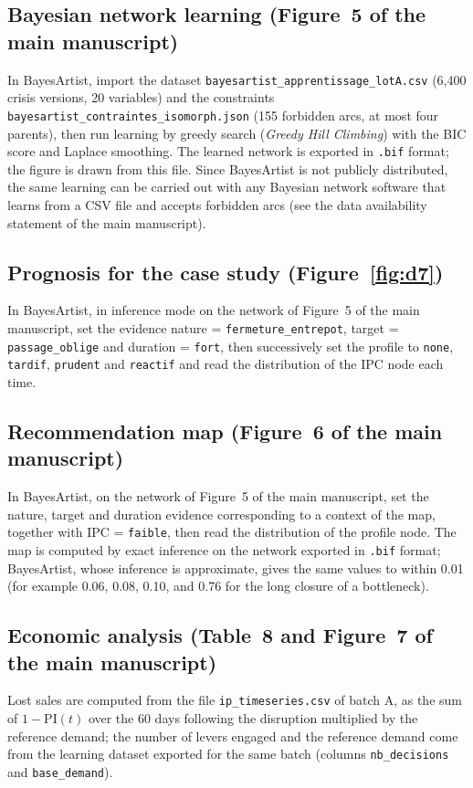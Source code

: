 \subsection*{Bayesian network learning (Figure~5 of the main manuscript)}

In BayesArtist, import the dataset \texttt{bayesartist\_apprentissage\_lotA.csv} (6,400 crisis versions, 20 variables) and the constraints \texttt{bayesartist\_contraintes\_isomorph.json} (155 forbidden arcs, at most four parents), then run learning by greedy search (\textit{Greedy Hill Climbing}) with the BIC score and Laplace smoothing. The learned network is exported in \texttt{.bif} format; the figure is drawn from this file. Since BayesArtist is not publicly distributed, the same learning can be carried out with any Bayesian network software that learns from a CSV file and accepts forbidden arcs (see the data availability statement of the main manuscript).

\subsection*{Prognosis for the case study (Figure~\ref{fig:d7})}

In BayesArtist, in inference mode on the network of Figure~5 of the main manuscript, set the evidence nature = \texttt{fermeture\_entrepot}, target = \texttt{passage\_oblige} and duration = \texttt{fort}, then successively set the profile to \texttt{none}, \texttt{tardif}, \texttt{prudent} and \texttt{reactif} and read the distribution of the IPC node each time.

\subsection*{Recommendation map (Figure~6 of the main manuscript)}

In BayesArtist, on the network of Figure~5 of the main manuscript, set the nature, target and duration evidence corresponding to a context of the map, together with IPC = \texttt{faible}, then read the distribution of the profile node. The map is computed by exact inference on the network exported in \texttt{.bif} format; BayesArtist, whose inference is approximate, gives the same values to within 0.01 (for example 0.06, 0.08, 0.10, and 0.76 for the long closure of a bottleneck).

\subsection*{Economic analysis (Table~8 and Figure~7 of the main manuscript)}

Lost sales are computed from the file \texttt{ip\_timeseries.csv} of batch A, as the sum of $1 - \mathrm{PI}(t)$ over the 60 days following the disruption multiplied by the reference demand; the number of levers engaged and the reference demand come from the learning dataset exported for the same batch (columns \texttt{nb\_decisions} and \texttt{base\_demand}).

